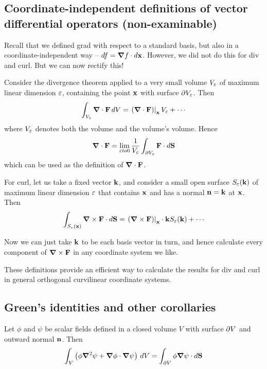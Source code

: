 \documentclass{../template/note}
\begin{document}
    \subsection{Coordinate-independent definitions of vector differential operators (non-examinable)}

    Recall that we defined grad with respect to a standard basis, but also in a coordinate-independent way -- \(df = \grad f \cdot d\V x\). However, we did not do this for div and curl. But we can now rectify this!

    Consider the divergence theorem applied to a very small volume \(V_\varepsilon\) of maximum linear dimension \(\varepsilon\), containing the point \(\V x\) with surface \(\partial V_\varepsilon\). Then
    \begin{align*}
        \int_{V_\eps} \div \V F \D V = \left.\left(\div \V F\right)\right|_{\V x} V_\eps + \cdots
    \end{align*}
    where \(V_\varepsilon\) denotes both the volume and the volume's volume. Hence
    \begin{align*}
        \div \V F = \lim_{\eps to 0} \frac{1}{V_\eps} \int_{\pr V_\eps} \V F \cdot d\V S
    \end{align*}
    which can be used as the definition of \(\div \V F\).

    For curl, let us take a fixed vector \(\V k\), and consider a small open surface \(S_\eps(\V k)\) of maximum linear dimension \(\varepsilon\) that contains \(\V x\) and has a normal \(\V n = \V k\) at \(\V x\). Then
    \begin{align*}
        \int_{S_\eps(\V x)} \curl \V F \cdot d\V S = \left.\left(\curl \V F\right)\right|_{\V x} \cdot \V k S_{\eps}(\V k) + \cdots
    \end{align*}

    Now we can just take \(\V k\) to be each basis vector in turn, and hence calculate every component of \(\curl \V F\) in any coordinate system we like.

    These definitions provide an efficient way to calculate the results for div and curl in general orthogonal curvilinear coordinate systems.
    
    \subsection{Green's identities and other corollaries}

    \begin{proposition*}
        Let \(\phi\) and \(\psi\) be scalar fields defined in a closed volume \(V\) with surface \(\partial V\) and outward normal \(\V n\). Then
        \begin{align*}
            \int_V \left(\phi \grad^2 \psi + \grad \phi \cdot \grad \psi\right) \D V = \int_{\pr V} \phi \grad \psi \cdot d\V S
        \end{align*}
    \end{proposition*}
    
\end{document}
